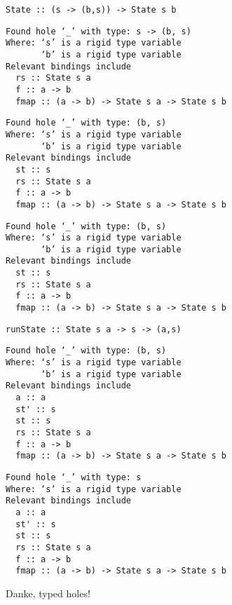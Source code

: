 \documentclass{beamer}
\begin{document}
\begin{frame}[fragile]
\begin{overprint}
\begin{verbatim}
State :: (s -> (b,s)) -> State s b
\end{verbatim}
\begin{verbatim}
Found hole ‘_’ with type: s -> (b, s)
Where: ‘s’ is a rigid type variable
       ‘b’ is a rigid type variable
Relevant bindings include
  rs :: State s a
  f :: a -> b
  fmap :: (a -> b) -> State s a -> State s b
\end{verbatim}
\begin{verbatim}
Found hole ‘_’ with type: (b, s)
Where: ‘s’ is a rigid type variable
       ‘b’ is a rigid type variable
Relevant bindings include
  st :: s
  rs :: State s a
  f :: a -> b
  fmap :: (a -> b) -> State s a -> State s b
\end{verbatim}
\begin{verbatim}
Found hole ‘_’ with type: (b, s)
Where: ‘s’ is a rigid type variable
       ‘b’ is a rigid type variable
Relevant bindings include
  st :: s
  rs :: State s a
  f :: a -> b
  fmap :: (a -> b) -> State s a -> State s b
\end{verbatim}
\begin{verbatim}
runState :: State s a -> s -> (a,s)
\end{verbatim}

\begin{verbatim}
Found hole ‘_’ with type: (b, s)
Where: ‘s’ is a rigid type variable
       ‘b’ is a rigid type variable
Relevant bindings include
  a :: a
  st' :: s
  st :: s
  rs :: State s a
  f :: a -> b
  fmap :: (a -> b) -> State s a -> State s b
\end{verbatim}
\begin{verbatim}
Found hole ‘_’ with type: s
Where: ‘s’ is a rigid type variable
Relevant bindings include
  a :: a
  st' :: s
  st :: s
  rs :: State s a
  f :: a -> b
  fmap :: (a -> b) -> State s a -> State s b
\end{verbatim}
\end{overprint}
\normalsize
\bigskip
{}
Danke, typed holes!
\end{frame}
\end{document}
